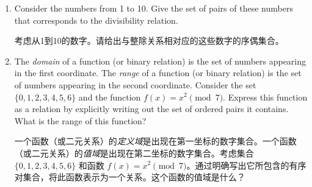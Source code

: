 \begin{enumerate}

    \item Consider the numbers from 1 to 10.  Give the set of pairs of these numbers that 
    corresponds to the divisibility relation.
    
    考虑从1到10的数字。请给出与整除关系相对应的这些数字的序偶集合。
    \vfill
    
    
    \vfill
    
    \item The \emph{domain} of a function (or binary relation) 
    is the set of numbers appearing in the first coordinate. The  
    \emph{range} of a function (or binary relation) is the set of numbers 
    appearing in the second coordinate. Consider the set $\{0,1,2,3,4,5,6\}$ and the function $f(x) = x^2 \pmod{7}$. Express this function as a relation by explicitly writing out the set of
    ordered pairs it contains. What is the range of this function?
     
    一个函数（或二元关系）的\emph{定义域}是出现在第一坐标的数字集合。一个函数（或二元关系）的\emph{值域}是出现在第二坐标的数字集合。考虑集合 $\{0,1,2,3,4,5,6\}$ 和函数 $f(x) = x^2 \pmod{7}$。通过明确写出它所包含的有序对集合，将此函数表示为一个关系。这个函数的值域是什么？
     \vfill
     
    \hint{
    \[ f \; = \; \{(0,0), (1,1), (2,4), (3,2), (4,2), (5,4), (6,1)\} \]
    \[ \Rng{f} \;= \; \{0,1,2,4\} \]
    
    }
    
    \vfill
    
    \workbookpagebreak
    \hintspagebreak
    

\end{enumerate}
